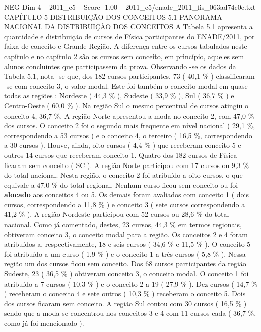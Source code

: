 \begin{textsample}{NEG Dim 4 – 2011\_c5 – Score -1.00 – 2011\_c5/enade\_2011\_fis\_063ad74c0e.txt}  \label{ex:f4_neg_119}
CAPÍTULO 5 DISTRIBUIÇÃO DOS CONCEITOS 5.1 PANORAMA NACIONAL DA DISTRIBUIÇÃO DOS CONCEITOS A Tabela 5.1 apresenta a quantidade e distribuição de cursos de Física participantes do ENADE/2011, por faixa de conceito e Grande Região.
A diferença entre os cursos tabulados neste capítulo e no capítulo 2 são os cursos sem conceito, em princípio, aqueles sem alunos concluintes que participassem da prova.
Observando -se os dados da Tabela 5.1, nota -se que, dos 182 cursos participantes, 73 ( 40,1 \% ) classificaram -se com conceito 3, o valor modal.
Este foi também o conceito modal em quase todas as regiões : Nordeste ( 44,3 \% ), Sudeste ( 33,9 \% ), Sul ( 36,7 \% ) e Centro-Oeste ( 60,0 \% ).
Na região Sul o mesmo percentual de cursos atingiu o conceito 4, 36,7 \%.
A região Norte apresentou a moda no conceito 2, com 47,0 \% dos cursos.
O conceito 2 foi o segundo mais frequente em nível nacional ( 29,1 \%, correspondendo a 53 cursos ) e o conceito 4, o terceiro ( 16,5 \%, correspondendo a 30 cursos ).
Houve, ainda, oito cursos ( 4,4 \% ) que receberam conceito 5 e outros 14 cursos que receberam conceito 1.
Quatro dos 182 cursos de Física ficaram sem conceito ( SC ).
A região Norte participou com 17 cursos ou 9,3 \% do total nacional.
Nesta região, o conceito 2 foi atribuído a oito cursos, o que equivale a 47,0 \% do total regional.
Nenhum curso ficou sem conceito ou foi \textbf{alocado} aos conceitos 4 ou 5.
Os demais foram avaliados com conceito 1 ( dois cursos, correspondendo a 11,8 \% ) e conceito 3 ( sete cursos correspondendo a 41,2 \% ).
A região Nordeste participou com 52 cursos ou 28,6 \% do total nacional.
Como já comentado, destes, 23 cursos, 44,3 \% em termos regionais, obtiveram conceito 3, o conceito modal para a região.
Os conceitos 2 e 4 foram atribuídos a, respectivamente, 18 e seis cursos ( 34,6 \% e 11,5 \% ).
O conceito 5 foi atribuído a um curso ( 1,9 \% ) e o conceito 1 a três cursos ( 5,8 \% ).
Nessa região um dos cursos ficou sem conceito.
Dos 68 cursos participantes da região Sudeste, 23 ( 36,5 \% ) obtiveram conceito 3, o conceito modal.
O conceito 1 foi atribuído a 7 cursos ( 10,3 \% ) e o conceito 2 a 19 ( 27,9 \% ).
Dez cursos ( 14,7 \% ) receberam o conceito 4 e sete outros ( 10,3 \% ) receberam o conceito 5.
Dois dos cursos ficaram sem conceito.
A região Sul contou com 30 cursos ( 16,5 \% ) sendo que a moda se concentrou nos conceitos 3 e 4 com 11 cursos cada ( 36,7 \%, como já foi mencionado ).

\end{textsample}
